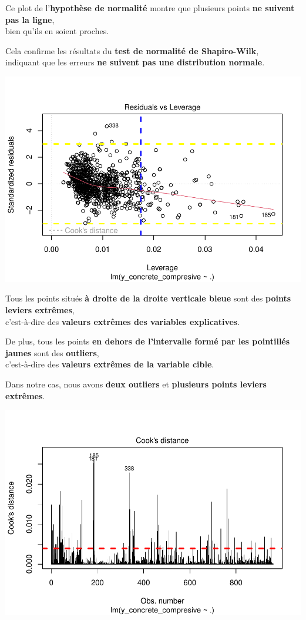 \documentclass[
  12pt,
]{article}
\begin{document}
Ce plot de l'\textbf{hypothèse de normalité} montre que plusieurs points
\textbf{ne suivent pas la ligne},\\
bien qu'ils en soient proches.

Cela confirme les résultats du \textbf{test de normalité de
Shapiro-Wilk},\\
indiquant que les erreurs \textbf{ne suivent pas une distribution
normale}.

\includegraphics{rmd_final_files/figure-latex/unnamed-chunk-45-1.pdf}

Tous les points situés \textbf{à droite de la droite verticale bleue}
sont des \textbf{points leviers extrêmes},\\
c'est-à-dire des \textbf{valeurs extrêmes des variables explicatives}.

De plus, tous les points \textbf{en dehors de l'intervalle formé par les
pointillés jaunes} sont des \textbf{outliers},\\
c'est-à-dire des \textbf{valeurs extrêmes de la variable cible}.

Dans notre cas, nous avons \textbf{deux outliers} et \textbf{plusieurs
points leviers extrêmes}.

\includegraphics{rmd_final_files/figure-latex/unnamed-chunk-46-1.pdf}
\end{document}
